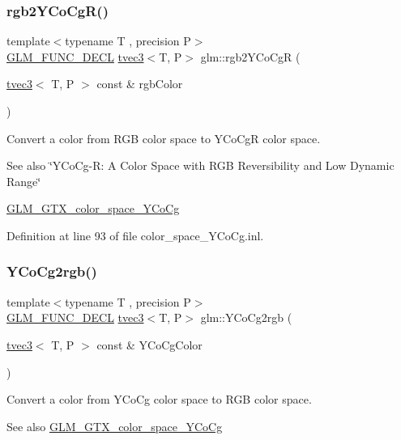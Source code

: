 \subsubsection{\texorpdfstring{rgb2YCoCgR()}{rgb2YCoCgR()}}
{\footnotesize\ttfamily template$<$typename T , precision P$>$ \\
\mbox{\hyperlink{setup_8hpp_ab2d052de21a70539923e9bcbf6e83a51}{G\+L\+M\+\_\+\+F\+U\+N\+C\+\_\+\+D\+E\+CL}} \mbox{\hyperlink{structglm_1_1tvec3}{tvec3}}$<$T, P$>$ glm\+::rgb2\+Y\+Co\+CgR (\begin{DoxyParamCaption}\item[{\mbox{\hyperlink{structglm_1_1tvec3}{tvec3}}$<$ T, P $>$ const \&}]{rgb\+Color }\end{DoxyParamCaption})}

Convert a color from R\+GB color space to Y\+Co\+CgR color space. \begin{DoxySeeAlso}{See also}
\char`\"{}\+Y\+Co\+Cg-\/\+R\+: A Color Space with R\+G\+B Reversibility and Low Dynamic Range\char`\"{} 

\mbox{\hyperlink{group__gtx__color__space___y_co_cg}{G\+L\+M\+\_\+\+G\+T\+X\+\_\+color\+\_\+space\+\_\+\+Y\+Co\+Cg}} 
\end{DoxySeeAlso}


Definition at line 93 of file color\+\_\+space\+\_\+\+Y\+Co\+Cg.\+inl.

\mbox{\label{group__gtx__color__space___y_co_cg_ga6d7e988a79b299ca1fa59f537e13800b}} 
\subsubsection{\texorpdfstring{YCoCg2rgb()}{YCoCg2rgb()}}
{\footnotesize\ttfamily template$<$typename T , precision P$>$ \\
\mbox{\hyperlink{setup_8hpp_ab2d052de21a70539923e9bcbf6e83a51}{G\+L\+M\+\_\+\+F\+U\+N\+C\+\_\+\+D\+E\+CL}} \mbox{\hyperlink{structglm_1_1tvec3}{tvec3}}$<$T, P$>$ glm\+::\+Y\+Co\+Cg2rgb (\begin{DoxyParamCaption}\item[{\mbox{\hyperlink{structglm_1_1tvec3}{tvec3}}$<$ T, P $>$ const \&}]{Y\+Co\+Cg\+Color }\end{DoxyParamCaption})}

Convert a color from Y\+Co\+Cg color space to R\+GB color space. \begin{DoxySeeAlso}{See also}
\mbox{\hyperlink{group__gtx__color__space___y_co_cg}{G\+L\+M\+\_\+\+G\+T\+X\+\_\+color\+\_\+space\+\_\+\+Y\+Co\+Cg}} 
\end{DoxySeeAlso}


